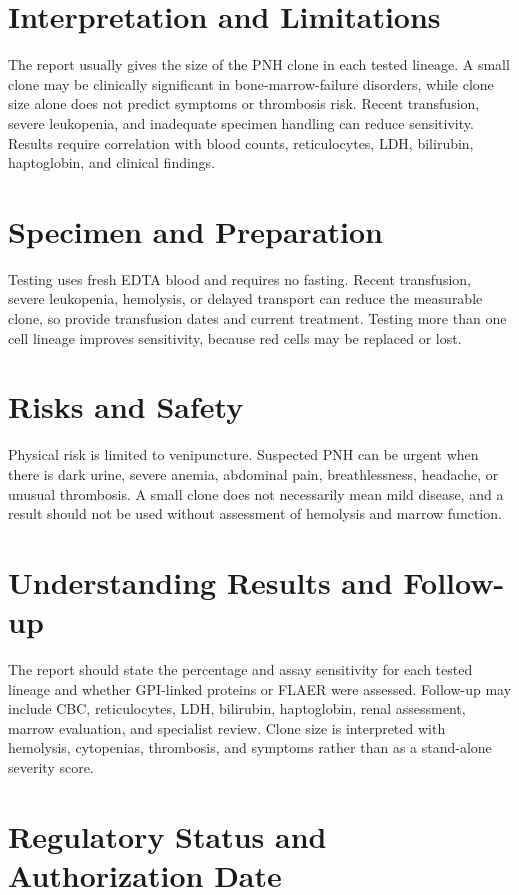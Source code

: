 \section*{Interpretation and Limitations}
The report usually gives the size of the PNH clone in each tested lineage. A small clone may be clinically significant in bone-marrow-failure disorders, while clone size alone does not predict symptoms or thrombosis risk. Recent transfusion, severe leukopenia, and inadequate specimen handling can reduce sensitivity. Results require correlation with blood counts, reticulocytes, LDH, bilirubin, haptoglobin, and clinical findings.
\section*{Specimen and Preparation}
Testing uses fresh EDTA blood and requires no fasting. Recent transfusion, severe leukopenia, hemolysis, or delayed transport can reduce the measurable clone, so provide transfusion dates and current treatment. Testing more than one cell lineage improves sensitivity, because red cells may be replaced or lost.

\section*{Risks and Safety}
Physical risk is limited to venipuncture. Suspected PNH can be urgent when there is dark urine, severe anemia, abdominal pain, breathlessness, headache, or unusual thrombosis. A small clone does not necessarily mean mild disease, and a result should not be used without assessment of hemolysis and marrow function.

\section*{Understanding Results and Follow-up}
The report should state the percentage and assay sensitivity for each tested lineage and whether GPI-linked proteins or FLAER were assessed. Follow-up may include CBC, reticulocytes, LDH, bilirubin, haptoglobin, renal assessment, marrow evaluation, and specialist review. Clone size is interpreted with hemolysis, cytopenias, thrombosis, and symptoms rather than as a stand-alone severity score.

\section*{Regulatory Status and Authorization Date}

\clearpage
